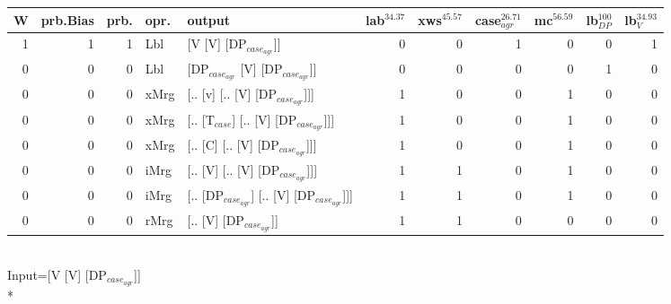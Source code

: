 \begin{tabularx}{\linewidth}{rrrlXrrrrrr}
\hline
   W &   prb.Bias &   prb. & opr.   & output                                    &   lab$^{34.37}$ &   xws$^{45.57}$ &   case$_{agr}^{26.71}$ &   mc$^{56.59}$ &   lb$_{DP}^{100}$ &   lb$_{V}^{34.93}$ \\
\hline
   1 &       1 &   1 & Lbl  & [V [V] [DP$_{case_{agr}}$]]                     &             0 &             0 &                  1 &            0 &                0 &              1 \\
   0 &       0 &   0 & Lbl  & [DP$_{case_{agr}}$ [V] [DP$_{case_{agr}}$]]           &             0 &             0 &                  0 &            0 &                1 &              0 \\
   0 &       0 &   0 & xMrg & [.. [v] [.. [V] [DP$_{case_{agr}}$]]]           &             1 &             0 &                  0 &            1 &                0 &              0 \\
   0 &       0 &   0 & xMrg & [.. [T$_{case}$] [.. [V] [DP$_{case_{agr}}$]]]      &             1 &             0 &                  0 &            1 &                0 &              0 \\
   0 &       0 &   0 & xMrg & [.. [C] [.. [V] [DP$_{case_{agr}}$]]]           &             1 &             0 &                  0 &            1 &                0 &              0 \\
   0 &       0 &   0 & iMrg & [.. [V] [.. [V] [DP$_{case_{agr}}$]]]           &             1 &             1 &                  0 &            1 &                0 &              0 \\
   0 &       0 &   0 & iMrg & [.. [DP$_{case_{agr}}$] [.. [V] [DP$_{case_{agr}}$]]] &             1 &             1 &                  0 &            1 &                0 &              0 \\
   0 &       0 &   0 & rMrg & [.. [V] [DP$_{case_{agr}}$]]                    &             1 &             1 &                  0 &            0 &                0 &              0 \\
\hline
\end{tabularx}\endgroup\\
\begingroup\scriptsize Input=[V [V] [DP$_{case_{agr}}$]]\\*
